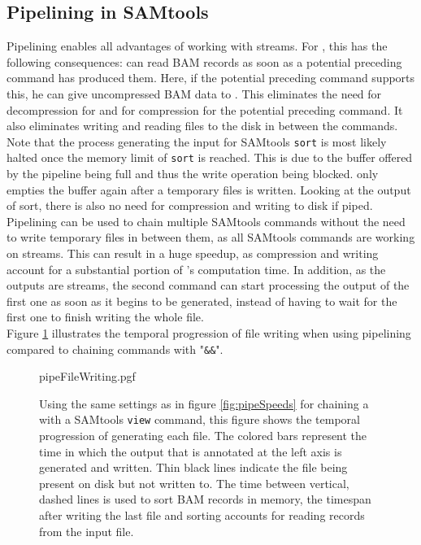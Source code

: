 \subsection{Pipelining in SAMtools}
Pipelining enables all advantages of working with streams. For \sort, this has the following consequences: \sort can read BAM records as soon as a potential preceding command has produced them. Here, if the potential preceding command supports this, he can give uncompressed BAM data to \sort. This eliminates the need for decompression for \sort and for compression for the potential preceding command. It also eliminates writing and reading files to the disk in between the commands. Note that the process generating the input for SAMtools \texttt{sort} is most likely halted once the memory limit of \texttt{sort} is reached. This is due to the buffer offered by the pipeline being full and thus the write operation being blocked. \sort only empties the buffer again after a temporary files is written. Looking at the output of sort, there is also no need for compression and writing to disk if piped. \\
Pipelining can be used to chain multiple SAMtools commands without the need to write temporary files in between them, as all SAMtools commands are working on streams. This can result in a huge speedup, as compression and writing account for a substantial portion of \sort's computation time. In addition, as the outputs are streams, the second command can start processing the output of the first one as soon as it begins to be generated, instead of having to wait for the first one to finish writing the whole file. \\
Figure \ref{fig:pipeWrite} illustrates the temporal progression of file writing when using pipelining compared to chaining commands with "\texttt{\&\&}".
\begin{figure}[t]
        {pipeFileWriting.pgf}
    \caption{Using the same settings as in figure \ref{fig:pipeSpeeds} for chaining a \sort with a SAMtools \texttt{view} command, this figure shows the temporal progression of generating each file. The colored bars represent the time in which the output that is annotated at the left axis is generated and written. Thin black lines indicate the file being present on disk but not written to. The time between vertical, dashed lines is used to sort BAM records in memory, the timespan after writing the last file and sorting accounts for reading records from the input file. }
    \label{fig:pipeWrite}
\end{figure}
